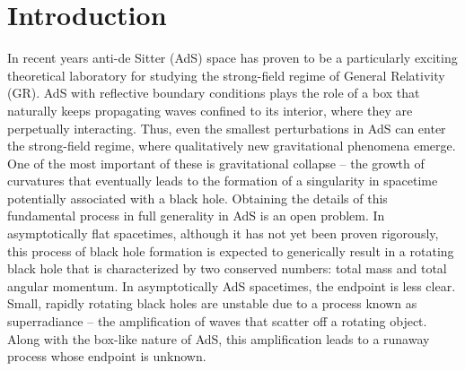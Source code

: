 \documentclass[a4paper,11pt]{article}
\numberwithin{equation}{section}
\begin{document}
\tableofcontents

%
% 

\hrulefill
\vspace{10pt}

\section{Introduction}

In recent years anti-de Sitter (AdS) space has proven to be a particularly exciting theoretical laboratory for studying the strong-field regime of General Relativity (GR).
AdS with reflective boundary conditions plays the role of a box that naturally keeps propagating waves confined to its interior, where they are perpetually interacting.
Thus, even the smallest perturbations in AdS can enter the strong-field regime, where qualitatively new gravitational phenomena emerge.
One of the most important of these is gravitational collapse -- the growth of curvatures that eventually leads to the formation of a singularity in spacetime potentially associated with a black hole.
Obtaining the details of this fundamental process in full generality in AdS is an open problem. 
In asymptotically flat spacetimes, although it has not yet been proven rigorously, this process of black hole formation is expected to generically result in a rotating black hole that is characterized by two conserved numbers: total mass and total angular momentum. 
In asymptotically AdS spacetimes, the endpoint is less clear.
Small, rapidly rotating black holes are unstable due to a process known as superradiance -- the amplification of waves that scatter off a rotating object. Along with the box-like nature of AdS, this amplification leads to a runaway process whose endpoint is unknown. 
\end{document}
